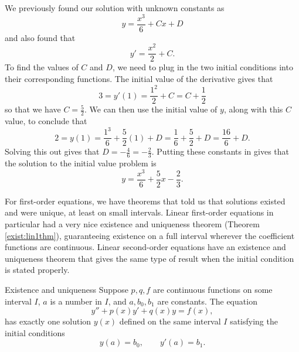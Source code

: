 \begin{exampleSol}
We previously found our solution with unknown constants as
\begin{equation*}
y = \frac{x^3}{6} + Cx + D
\end{equation*}
and also found that
\begin{equation*}
y' = \frac{x^2}{2} + C.
\end{equation*}
To find the values of $C$ and $D$, we need to plug in the two initial conditions into their corresponding functions. The initial value of the derivative gives that
\begin{equation*}
3 = y'(1) = \frac{1^2}{2} + C = C + \frac{1}{2}
\end{equation*}
so that we have $C = \frac{5}{2}$. We can then use the initial value of $y$, along with this $C$ value, to conclude that
\begin{equation*}
2 = y(1) = \frac{1^3}{6} + \frac{5}{2}(1) + D = \frac{1}{6} + \frac{5}{2} + D = \frac{16}{6} + D.
\end{equation*}
Solving this out gives that $D = -\frac{4}{6} = -\frac{2}{3}$. Putting these constants in gives that the solution to the initial value problem is
\begin{equation*}
y = \frac{x^3}{6} + \frac{5}{2}x - \frac{2}{3}.
\end{equation*}
\end{exampleSol}

For first-order equations, we have theorems that told us that solutions existed and were unique, at least on small intervals. Linear first-order equations in particular had a very nice existence and uniqueness theorem (Theorem \ref{exist:lin1thm}), guaranteeing existence on a full interval wherever the coefficient functions are continuous. Linear second-order equations have an existence and uniqueness theorem that gives the same type of result when the initial condition is stated properly.

\begin{theorem1}{Existence and uniqueness}
Suppose $p, q, f$ are continuous functions on some interval
$I$, $a$ is a number in $I$,
and $a, b_0, b_1$ are constants.
The equation
\begin{equation*}
y'' + p(x) y' + q(x) y = f(x) ,
\end{equation*}
has exactly one solution $y(x)$ defined on the same interval $I$ satisfying the initial conditions
\begin{equation*}
y(a) = b_0 , \qquad y'(a) = b_1 .
\end{equation*}
\end{theorem1}

